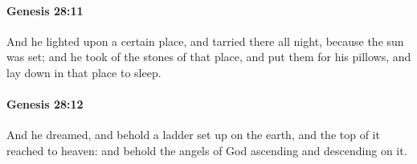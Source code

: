 		\paragraph{Genesis 28:11} %
			\label{GENESIS-28-11}

			And he lighted upon a certain place, and tarried there all night, because the sun was set; and he took of the stones of that place, and put them for his pillows, and lay down in that place to sleep.


		\paragraph{Genesis 28:12} %
			\label{GENESIS-28-12}

			And he dreamed, and behold a ladder set up on the earth, and the top of it reached to heaven: and behold the angels of God ascending and descending on it.


